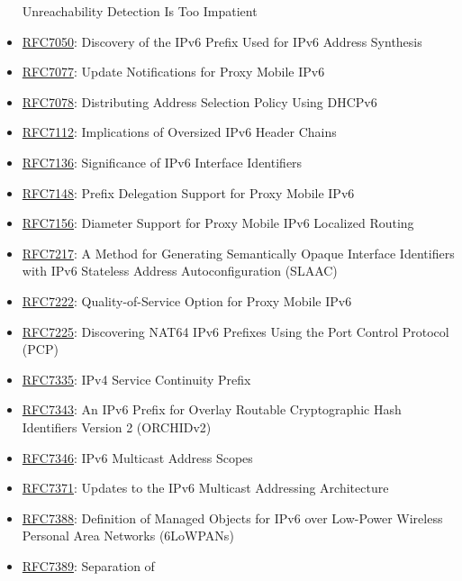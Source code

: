\documentclass[
]{article}
\begin{document}
\begin{itemize}
  Unreachability Detection Is Too Impatient
\item
  \href{https://www.rfc-editor.org/info/rfc7050}{RFC7050}: Discovery of
  the IPv6 Prefix Used for IPv6 Address Synthesis
\item
  \href{https://www.rfc-editor.org/info/rfc7077}{RFC7077}: Update
  Notifications for Proxy Mobile IPv6
\item
  \href{https://www.rfc-editor.org/info/rfc7078}{RFC7078}: Distributing
  Address Selection Policy Using DHCPv6
\item
  \href{https://www.rfc-editor.org/info/rfc7112}{RFC7112}: Implications
  of Oversized IPv6 Header Chains
\item
  \href{https://www.rfc-editor.org/info/rfc7136}{RFC7136}: Significance
  of IPv6 Interface Identifiers
\item
  \href{https://www.rfc-editor.org/info/rfc7148}{RFC7148}: Prefix
  Delegation Support for Proxy Mobile IPv6
\item
  \href{https://www.rfc-editor.org/info/rfc7156}{RFC7156}: Diameter
  Support for Proxy Mobile IPv6 Localized Routing
\item
  \href{https://www.rfc-editor.org/info/rfc7217}{RFC7217}: A Method for
  Generating Semantically Opaque Interface Identifiers with IPv6
  Stateless Address Autoconfiguration (SLAAC)
\item
  \href{https://www.rfc-editor.org/info/rfc7222}{RFC7222}:
  Quality-of-Service Option for Proxy Mobile IPv6
\item
  \href{https://www.rfc-editor.org/info/rfc7225}{RFC7225}: Discovering
  NAT64 IPv6 Prefixes Using the Port Control Protocol (PCP)
\item
  \href{https://www.rfc-editor.org/info/rfc7335}{RFC7335}: IPv4 Service
  Continuity Prefix
\item
  \href{https://www.rfc-editor.org/info/rfc7343}{RFC7343}: An IPv6
  Prefix for Overlay Routable Cryptographic Hash Identifiers Version 2
  (ORCHIDv2)
\item
  \href{https://www.rfc-editor.org/info/rfc7346}{RFC7346}: IPv6
  Multicast Address Scopes
\item
  \href{https://www.rfc-editor.org/info/rfc7371}{RFC7371}: Updates to
  the IPv6 Multicast Addressing Architecture
\item
  \href{https://www.rfc-editor.org/info/rfc7388}{RFC7388}: Definition of
  Managed Objects for IPv6 over Low-Power Wireless Personal Area
  Networks (6LoWPANs)
\item
  \href{https://www.rfc-editor.org/info/rfc7389}{RFC7389}: Separation of

\end{itemize}
\end{document}
